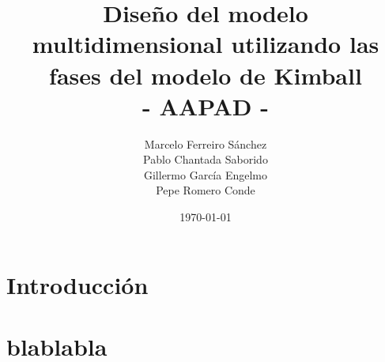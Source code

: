 \documentclass[12pt,a4paper]{article}
\title{Diseño del modelo multidimensional utilizando las fases del modelo de Kimball\\
\large - AAPAD - }
\author{Marcelo Ferreiro Sánchez\\ Pablo Chantada Saborido \\ Gillermo García Engelmo \\Pepe Romero Conde}
\date{\today}
\begin{document}
\maketitle

\tableofcontents

\newpage

\section{Introducción}

\section{blablabla}
\end{document}
